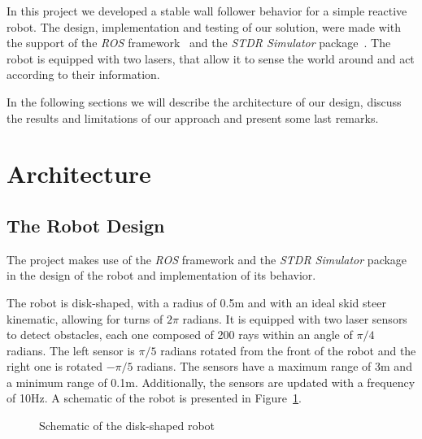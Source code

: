 \documentclass[10pt,journal,compsoc]{IEEEtran}
\begin{document}
In this project we developed a stable wall follower behavior for a simple reactive robot. The design, implementation and testing of our solution, were made with the support of the \textit{ROS} framework~\cite{ROS,AGITR} and the \textit{STDR Simulator} package~\cite{STDR}. The robot is equipped with two lasers, that allow it to sense the world around and act according to their information. 

In the following sections we will describe the architecture of our design, discuss the results and limitations of our approach and present some last remarks.


\section{Architecture}
\subsection{The Robot Design}

The project makes use of the \textit{ROS} framework and the \textit{STDR Simulator} package in the design of the robot and implementation of its behavior.

The robot is disk-shaped, with a radius of 0.5m and with an ideal skid steer kinematic, allowing for turns of $2\pi$ radians. It is equipped with two laser sensors to detect obstacles, each one composed of 200 rays within an angle of $\pi/4$ radians. The left sensor is $\pi/5$ radians rotated from the front of the robot and the right one is rotated $-\pi/5$ radians. The sensors have a maximum range of 3m and a minimum range of 0.1m. Additionally, the sensors are updated with a frequency of 10Hz. A schematic of the robot is presented in Figure~\ref{fig:robot}.


\begin{figure}[thpb]
\centering
{}
\caption{Schematic of the disk-shaped robot}
\label{fig:robot}
\end{figure}
\end{document}
